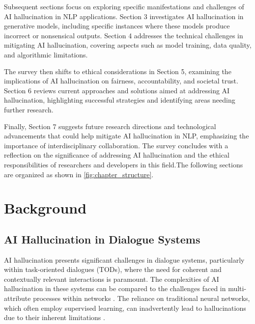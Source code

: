 Subsequent sections focus on exploring specific manifestations and challenges of AI hallucination in NLP applications. Section 3 investigates AI hallucination in generative models, including specific instances where these models produce incorrect or nonsensical outputs. Section 4 addresses the technical challenges in mitigating AI hallucination, covering aspects such as model training, data quality, and algorithmic limitations. 



The survey then shifts to ethical considerations in Section 5, examining the implications of AI hallucination on fairness, accountability, and societal trust. Section 6 reviews current approaches and solutions aimed at addressing AI hallucination, highlighting successful strategies and identifying areas needing further research. 



Finally, Section 7 suggests future research directions and technological advancements that could help mitigate AI hallucination in NLP, emphasizing the importance of interdisciplinary collaboration. The survey concludes with a reflection on the significance of addressing AI hallucination and the ethical responsibilities of researchers and developers in this field.The following sections are organized as shown in \autoref{fig:chapter_structure}.








\section{Background} \label{sec:Background}



\subsection{AI Hallucination in Dialogue Systems} \label{subsec:AI Hallucination in Dialogue Systems}

AI hallucination presents significant challenges in dialogue systems, particularly within task-oriented dialogues (TODs), where the need for coherent and contextually relevant interactions is paramount. The complexities of AI hallucination in these systems can be compared to the challenges faced in multi-attribute processes within networks \cite{shakarian2022reasoningcomplexnetworkslogic}. The reliance on traditional neural networks, which often employ supervised learning, can inadvertently lead to hallucinations due to their inherent limitations \cite{le2019evolvingselfsupervisedneuralnetworks}. 



